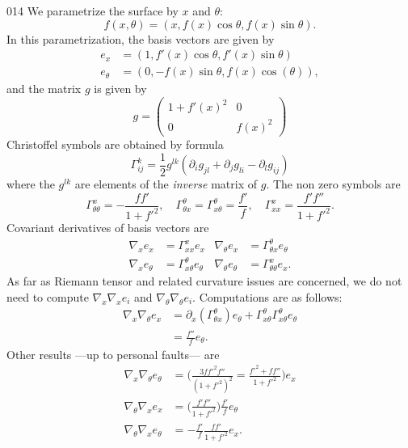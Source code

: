 \begin{corrige}{014}
We parametrize the surface by $x$ and $\theta$:
\[ 
  f(x,\theta)=(x,f(x)\cos\theta,f(x)\sin\theta).
\]
In this parametrization, the basis vectors are given by
\begin{subequations}
\begin{align}
  e_x&=(1,f'(x)\cos\theta,f'(x)\sin\theta)\\
	e_{\theta}&=(0,-f(x)\sin\theta,f(x)\cos(\theta)),
\end{align}
\end{subequations}
and the matrix $g$ is given by
\[ 
  g=
\begin{pmatrix}
1+f'(x)^2&0\\0&f(x)^2
\end{pmatrix}
\]
Christoffel symbols are obtained by formula
\[ 
  \Gamma_{ij}^{k}=\frac{ 1 }{2}g^{lk}(\partial_ig_{jl}+\partial_jg_{li}-\partial_lg_{ij})
\]
where the $g^{lk}$ are elements of the \emph{inverse} matrix of $g$. The non zero symbols are
\begin{equation}
\Gamma_{\theta\theta}^{x}=-\frac{ ff' }{ 1+{f'}^2 },\quad\Gamma_{\theta x}^{\theta}=\Gamma_{x\theta}^{\theta}=\frac{ f' }{ f },\quad\Gamma_{xx}^{x}=\frac{ f'f'' }{ 1+{f'}^2 }.
\end{equation}
Covariant derivatives of basis vectors are
\begin{align}
\nabla_xe_x&=\Gamma_{xx}^{x}e_x&\nabla_{\theta}e_x&=\Gamma_{\theta x}^{\theta}e_{\theta}\\
\nabla_xe_{\theta}&=\Gamma_{x\theta}^{\theta}e_{\theta}&\nabla_{\theta}e_{\theta}&=\Gamma_{\theta\theta}^{x}e_x.
\end{align}
As far as Riemann tensor and related curvature issues are concerned, we do not need to compute $\nabla_x\nabla_xe_i$ and $\nabla_{\theta}\nabla_{\theta}e_i$. Computations are as follows:
\[ 
\begin{split}
\nabla_x\nabla_{\theta}e_x&=\partial_x(\Gamma_{\theta x}^{\theta})e_{\theta}+\Gamma_{x\theta}^{\theta}\Gamma_{x\theta}^{\theta}e_{\theta}\\
	&=\frac{ f'' }{ f }e_{\theta}.
\end{split}  
\]
Other results ---up to personal faults--- are
\begin{equation}
\begin{aligned}
\nabla_x\nabla_{\theta}e_{\theta}&=\Big( \frac{ 3f{f'}^2f'' }{ (1+{f'}^2)^2 }=\frac{ {f'}^2+ff'' }{ 1+{f'}^2 } \Big)e_x\\
\nabla_{\theta}\nabla_xe_x&=\Big( \frac{ f'f'' }{ 1+{f'}^2 } \Big)\frac{ f' }{ f }e_{\theta}\\
\nabla_{\theta}\nabla_xe_{\theta}&=-\frac{ f' }{ f }\frac{ ff' }{ 1+{f'}^2 }e_x.
\end{aligned}
\end{equation}


\end{corrige}
